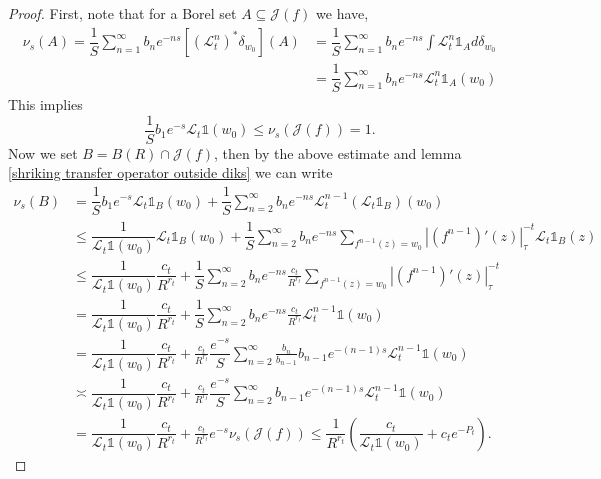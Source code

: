 \documentclass[12pt,reqno]{amsart}
\begin{document}
\begin{proof}
First, note that for a Borel set $A\subseteq \mathcal{J}(f)$ we have,
\begin{align*}
       \nu_s \left(A \right) =\dfrac{1}{S}\sum_{n=1}^{\infty}b_ne^{-ns}\left[\left(\mathcal{L}_t^n \right)^*\delta_{w_0}\right]\left(A \right) &=\dfrac{1}{S}\sum_{n=1}^{\infty}b_ne^{-ns}\int \mathcal{L}_t^n \mathbb{1}_A d\delta_{w_0} \\
       &=\dfrac{1}{S}\sum_{n=1}^{\infty}b_ne^{-ns} \mathcal{L}_t^n \mathbb{1}_A(w_0)
       \end{align*}
This implies 
       $$\dfrac{1}{S}b_1e^{-s}\mathcal{L}_t \mathbb{1}(w_0) \leq \nu_s(\mathcal{J}(f))=1.$$
Now we set $B=B(R)\cap \mathcal{J}(f)$, then by the above estimate and lemma \ref{shriking transfer operator outside diks} we can write
    \begin{align*}
       \nu_s \left(B \right) &=\dfrac{1}{S}b_1e^{-s}\mathcal{L}_t \mathbb{1}_B(w_0) +\dfrac{1}{S}\sum_{n=2}^{\infty}b_ne^{-ns} \mathcal{L}_t^{n-1}\left(\mathcal{L}_t \mathbb{1}_B\right)(w_0) \\
       &\leq \dfrac{1}{\mathcal{L}_t \mathbb{1}(w_0)}\mathcal{L}_t \mathbb{1}_B(w_0)+ \dfrac{1}{S}\sum_{n=2}^{\infty}b_ne^{-ns} \sum_{f^{n-1}(z)=w_0}|(f^{n-1})'(z)|_{\tau}^{-t} \mathcal{L}_t \mathbb{1}_B(z) \\
       &\leq \dfrac{1}{\mathcal{L}_t \mathbb{1}(w_0)}\dfrac{c_t}{R^{r_t}} + \dfrac{1}{S}\sum_{n=2}^{\infty}b_ne^{-ns}\frac{c_t}{R^{r_t}} \sum_{f^{n-1}(z)=w_0}|(f^{n-1})'(z)|_{\tau}^{-t} \\
       &= \dfrac{1}{\mathcal{L}_t \mathbb{1}(w_0)}\dfrac{c_t}{R^{r_t}} + \dfrac{1}{S}\sum_{n=2}^{\infty}b_ne^{-ns}\frac{c_t}{R^{r_t}} \mathcal{L}_t^{n-1}\mathbb{1}(w_0) \\
       &= \dfrac{1}{\mathcal{L}_t \mathbb{1}(w_0)}\dfrac{c_t}{R^{r_t}} + \frac{c_t}{R^{r_t}}\dfrac{e^{-s}}{S}\sum_{n=2}^{\infty}\frac{b_n}{b_{n-1}}b_{n-1}e^{-(n-1)s} \mathcal{L}_t^{n-1}\mathbb{1}(w_0) \\
       &\asymp \dfrac{1}{\mathcal{L}_t \mathbb{1}(w_0)}\dfrac{c_t}{R^{r_t}} + \frac{c_t}{R^{r_t}}\dfrac{e^{-s}}{S}\sum_{n=2}^{\infty}b_{n-1}e^{-(n-1)s} \mathcal{L}_t^{n-1}\mathbb{1}(w_0) \\
       &=\dfrac{1}{\mathcal{L}_t \mathbb{1}(w_0)}\dfrac{c_t}{R^{r_t}} + \frac{c_t}{R^{r_t}}e^{-s}\nu_s(\mathcal{J}(f)) \leq \dfrac{1}{R^{r_t}}\left(\dfrac{c_t}{\mathcal{L}_t \mathbb{1}(w_0)}+c_te^{-P_t} \right).
    \end{align*}
\end{proof}
\end{document}
